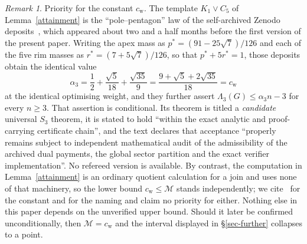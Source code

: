 \documentclass[11pt]{article}
\theoremstyle{remark}\newtheorem{remark}[theorem]{Remark}
\newcommand{\cstar}{c_{\mathrm{w}}}
\numberwithin{equation}{section}
\begin{document}
\begin{remark}\label{rem-newton}
Priority for the constant $\cstar$. The template $K_1\vee C_5$ of
Lemma~\ref{attainment} is the ``pole--pentagon'' law of the self-archived
Zenodo deposits~\cite{Newton1,Newton2}, which appeared about two and a half
months before the first version of the present paper. Writing the apex mass
as $p^*=(91-25\sqrt7)/126$ and each of the five rim masses as
$r^*=(7+5\sqrt7)/126$, so that $p^*+5r^*=1$, those deposits obtain the
identical value
\[
 \alpha_3=\frac12+\frac{\sqrt5}{18}+\frac{\sqrt{35}}9
        =\frac{9+\sqrt5+2\sqrt{35}}{18}=\cstar
\]
at the identical optimising weight, and they further assert
$\Lambda_3(G)\le\alpha_3n-3$ for every $n\ge3$. That assertion is
conditional. Its theorem is titled a \emph{candidate} universal $S_3$
theorem, it is stated to hold ``within the exact analytic and
proof-carrying certificate chain'', and the text declares that acceptance
``properly remains subject to independent mathematical audit of the
admissibility of the archived dual payments, the global sector partition and
the exact verifier implementation''. No refereed version is available. By
contrast, the computation in Lemma~\ref{attainment} is an ordinary quotient
calculation for a join and uses none of that machinery, so the lower bound
$\cstar\le\mathcal M$ stands independently; we cite~\cite{Newton1,Newton2}
for the constant and for the naming and claim no priority for either.
Nothing else in this paper depends on the unverified upper bound. Should it
later be confirmed unconditionally, then $\mathcal M=\cstar$ and the
interval displayed in \S\ref{sec-further} collapses to a point.
\end{remark}
\end{document}

